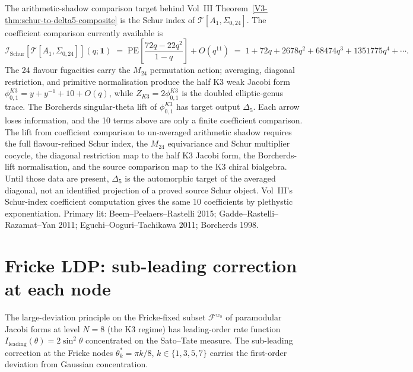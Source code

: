 \begin{remark}
\label{rem:as-gelfand-schur-composite}
The arithmetic-shadow comparison target behind Vol~III
Theorem~\ref*{V3-thm:schur-to-delta5-composite} is the Schur index of
$\mathcal{T}[A_1,\Sigma_{0,24}]$. The coefficient comparison currently
available is
\[
\mathcal{I}_{\mathrm{Schur}}[\mathcal{T}[A_1,\Sigma_{0,24}]](q;\mathbf{1})
\;=\;
\mathrm{PE}\!\left[\frac{72q - 22q^2}{1-q}\right] + O(q^{11})
\;=\;
1 + 72q + 2678q^2 + 68474q^3 + 1351775q^4 + \cdots.
\]
The 24 flavour fugacities carry the $M_{24}$ permutation action; averaging,
diagonal restriction, and primitive normalisation produce the half K3 weak
Jacobi form
$\phi_{0,1}^{K3}=y+y^{-1}+10+O(q)$, while
$Z_{K3}=2\phi_{0,1}^{K3}$ is the doubled elliptic-genus trace.  The
Borcherds singular-theta lift of $\phi_{0,1}^{K3}$ has target output
$\Delta_5$. Each arrow loses information, and the 10
terms above are only a finite coefficient comparison. The lift from
coefficient comparison to un-averaged arithmetic shadow requires the
full flavour-refined Schur index, the \(M_{24}\) equivariance and Schur
multiplier cocycle, the diagonal restriction map to the half K3 Jacobi form,
the Borcherds-lift normalisation, and the source comparison map to the
K3 chiral bialgebra. Until those data are present, $\Delta_5$ is the
automorphic target of the averaged diagonal, not an identified projection
of a proved source Schur object.
Vol~III's Schur-index coefficient computation gives the same 10
coefficients by plethystic exponentiation. Primary lit:
Beem--Peelaers--Rastelli 2015;
Gadde--Rastelli--Razamat--Yan 2011; Eguchi--Ooguri--Tachikawa 2011;
Borcherds 1998.
\end{remark}

\section{Fricke LDP: sub-leading correction at each node}
\label{sec:fricke-ldp-sub-leading}

The large-deviation principle on the Fricke-fixed subset
$\mathcal F^{w_8}$ of paramodular Jacobi forms at level $N = 8$
(the K3 regime) has leading-order rate function
$I_{\mathrm{leading}}(\theta) = 2\sin^2\theta$ concentrated on the
Sato--Tate measure. The sub-leading correction at the Fricke nodes
$\theta_k^* = \pi k/8$, $k\in\{1, 3, 5, 7\}$ carries the first-order
deviation from Gaussian concentration.

